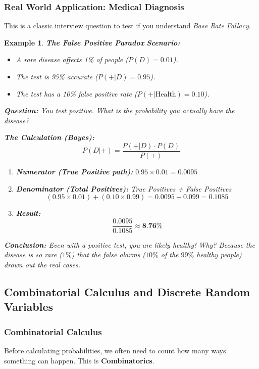 \documentclass[11pt]{article}
\theoremstyle{smallexample}
\newtheorem{example}{Example}[section]
\begin{document}
\subsubsection{Real World Application: Medical Diagnosis}
This is a classic interview question to test if you understand \textit{Base Rate Fallacy}.

\begin{example}{\textbf{The False Positive Paradox}}
\textbf{Scenario:}
\begin{itemize}
    \item A rare disease affects 1\% of people ($P(D) = 0.01$).
    \item The test is 95\% accurate ($P(+|D) = 0.95$).
    \item The test has a 10\% false positive rate ($P(+|\text{Health}) = 0.10$).
\end{itemize}
\textbf{Question:} You test positive. What is the probability you actually have the disease?

\textbf{The Calculation (Bayes):}
\[ P(D|+) = \frac{P(+|D) \cdot P(D)}{P(+)} \]

\begin{enumerate}
    \item \textbf{Numerator (True Positive path):} $0.95 \times 0.01 = 0.0095$
    \item \textbf{Denominator (Total Positives):}
    True Positives + False Positives
    \[ (0.95 \times 0.01) + (0.10 \times 0.99) = 0.0095 + 0.099 = 0.1085 \]
    \item \textbf{Result:}
    \[ \frac{0.0095}{0.1085} \approx \textbf{8.76\%} \]
\end{enumerate}

\textbf{Conclusion:} Even with a positive test, you are likely healthy! Why? Because the disease is so rare ($1\%$) that the false alarms ($10\%$ of the $99\%$ healthy people) drown out the real cases.
\end{example}



\subsection{Combinatorial Calculus and Discrete Random Variables}

\subsubsection{Combinatorial Calculus}

Before calculating probabilities, we often need to count how many ways something can happen. This is \textbf{Combinatorics}.
\end{document}
